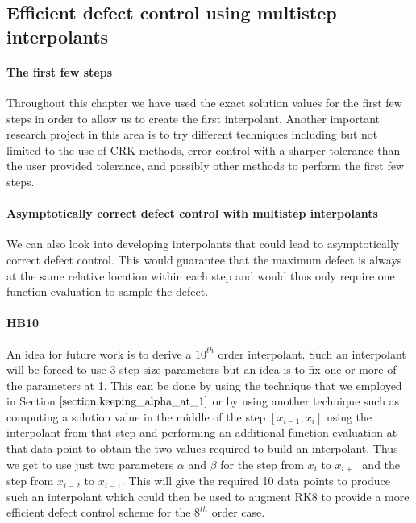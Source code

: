 \documentclass{report}
\begin{document}
\subsection{Efficient defect control using multistep interpolants}
\label{section:HB_future_work}

\paragraph{The first few steps}
Throughout this chapter we have used the exact solution values for the first few steps in order to allow us to create the first interpolant. Another important research project in this area is to try different techniques including but not limited to the use of CRK methods, error control with a sharper tolerance than the user provided tolerance, and possibly other methods to perform the first few steps.

\paragraph{Asymptotically correct defect control with multistep interpolants}
We can also look into developing interpolants that could lead to asymptotically correct defect control. This would guarantee that the maximum defect is always at the same relative location within each step and would thus only require one function evaluation to sample the defect.

\paragraph{HB10}
An idea for future work is to derive a $10^{th}$ order interpolant. Such an interpolant will be forced to use 3 step-size parameters but an idea is to fix one or more of the parameters at 1. This can be done by using the technique that we employed in Section $\ref{section:keeping_alpha_at_1}$ or by using another technique such as computing a solution value in the middle of the step $[x_{i-1}, x_i]$ using the interpolant from that step and performing an additional function evaluation at that data point to obtain the two values required to build an interpolant. Thus we get to use just two parameters $\alpha$ and $\beta$ for the step from $x_i$ to $x_{i+1}$ and the step from $x_{i-2}$ to $x_{i-1}$.  This will give the required 10 data points to produce such an interpolant which could then be used to augment RK8 to provide a more efficient defect control scheme for the $8^{th}$ order case. 
\end{document}
